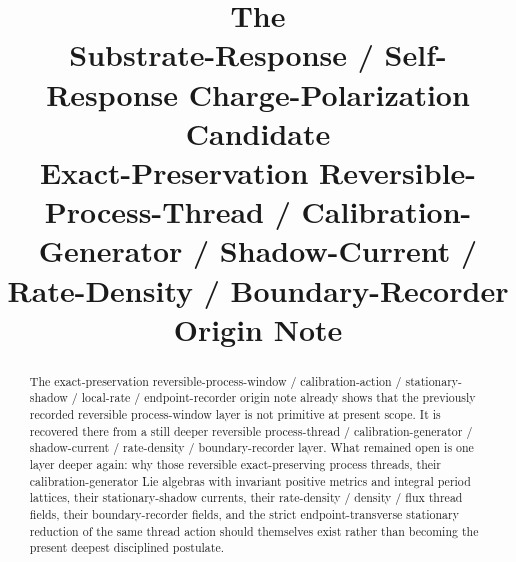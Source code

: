 \documentclass[11pt]{article}
\title{\textbf{The \TheoryName{}}\\[0.4em]
\large Substrate-Response / Self-Response Charge-Polarization Candidate\\
\large Exact-Preservation Reversible-Process-Thread / Calibration-Generator / Shadow-Current / Rate-Density / Boundary-Recorder\\
\large Origin Note}
\author{}
\date{}
\begin{document}
\maketitle

\begin{abstract}
The exact-preservation reversible-process-window / calibration-action / stationary-shadow / local-rate / endpoint-recorder origin note already shows that the previously recorded reversible process-window layer is not primitive at present scope. It is recovered there from a still deeper reversible process-thread / calibration-generator / shadow-current / rate-density / boundary-recorder layer. What remained open is one layer deeper again: why those reversible exact-preserving process threads, their calibration-generator Lie algebras with invariant positive metrics and integral period lattices, their stationary-shadow currents, their rate-density / density / flux thread fields, their boundary-recorder fields, and the strict endpoint-transverse stationary reduction of the same thread action should themselves exist rather than becoming the present deepest disciplined postulate.


\end{abstract}
\end{document}
